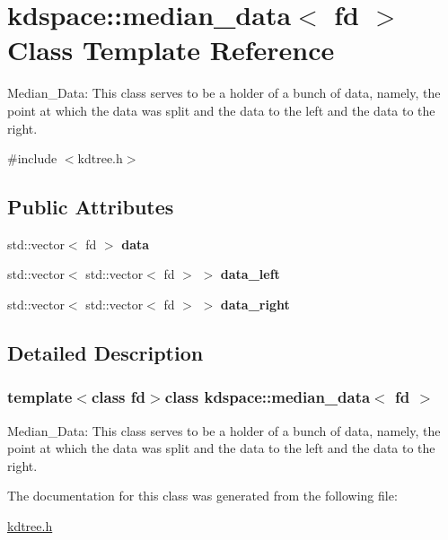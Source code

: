 \hypertarget{classkdspace_1_1median__data}{\section{kdspace\-:\-:median\-\_\-data$<$ fd $>$ Class Template Reference}
\label{classkdspace_1_1median__data}
}


Median\-\_\-\-Data\-: This class serves to be a holder of a bunch of data, namely, the point at which the data was split and the data to the left and the data to the right.  




{\ttfamily \#include $<$kdtree.\-h$>$}

\subsection*{Public Attributes}
\begin{DoxyCompactItemize}
\item 
\hypertarget{classkdspace_1_1median__data_a9a41462b5c13293ee2d547ae85d2215e}{std\-::vector$<$ fd $>$ {\bfseries data}}\label{classkdspace_1_1median__data_a9a41462b5c13293ee2d547ae85d2215e}

\item 
\hypertarget{classkdspace_1_1median__data_aed7ddade6ee2f24873de366059301a4f}{std\-::vector$<$ std\-::vector$<$ fd $>$ $>$ {\bfseries data\-\_\-left}}\label{classkdspace_1_1median__data_aed7ddade6ee2f24873de366059301a4f}

\item 
\hypertarget{classkdspace_1_1median__data_ab79689b91618831f957372b0af7fd298}{std\-::vector$<$ std\-::vector$<$ fd $>$ $>$ {\bfseries data\-\_\-right}}\label{classkdspace_1_1median__data_ab79689b91618831f957372b0af7fd298}

\end{DoxyCompactItemize}


\subsection{Detailed Description}
\subsubsection*{template$<$class fd$>$class kdspace\-::median\-\_\-data$<$ fd $>$}

Median\-\_\-\-Data\-: This class serves to be a holder of a bunch of data, namely, the point at which the data was split and the data to the left and the data to the right. 

The documentation for this class was generated from the following file\-:\begin{DoxyCompactItemize}
\item 
\hyperlink{kdtree_8h}{kdtree.\-h}\end{DoxyCompactItemize}
